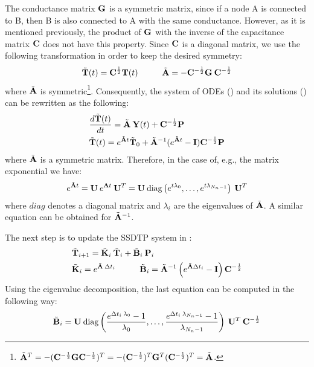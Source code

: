 The conductance matrix $\mathbf{G}$ is a symmetric matrix, since if a node A is connected to B, then B is also connected to A with the same conductance. However, as it is mentioned previously, the product of $\mathbf{G}$ with the inverse of the capacitance matrix $\mathbf{C}$ does not have this property. Since $\mathbf{C}$ is a diagonal matrix, we use the following transformation in order to keep the desired symmetry:
\begin{equation} \label{eq:substitution}
  \tilde{\v{T}}(t) = \m{C}^{\frac{1}{2}} \v{T}(t) \hs \tilde{\m{A}} = -\m{C}^{-\frac{1}{2}} \m{G} \: \m{C}^{-\frac{1}{2}}
\end{equation}
where $\tilde{\mathbf{A}}$ is symmetric\footnote{$\tilde{\mathbf{A}}^T = -(\mathbf{C}^{-\frac{1}{2}} \mathbf{G} \mathbf{C}^{-\frac{1}{2}})^T = -(\mathbf{C}^{-\frac{1}{2}})^T \mathbf{G}^T (\mathbf{C}^{-\frac{1}{2}})^T = \tilde{\mathbf{A}}$.}. Consequently, the system of ODEs () and its solutions () can be rewritten as the following:
\begin{align*}
  & \frac{d\tilde{\mathbf{T}}(t)}{dt} = \tilde{\mathbf{A}} \: \mathbf{Y}(t) + \mathbf{C}^{-\frac{1}{2}} \mathbf{P} \\
  & \tilde{\mathbf{T}}(t) = e^{\tilde{\mathbf{A}} t} \tilde{\mathbf{T}}_0 + \tilde{\mathbf{A}}^{-1} (e^{\tilde{\mathbf{A}} t} - \mathbf{I}) \mathbf{C}^{-\frac{1}{2}} \mathbf{P}
\end{align*}
where $\tilde{\mathbf{A}}$ is a symmetric matrix. Therefore, in the case of, e.g., the matrix exponential we have:
\begin{equation} \label{eq:matrix-exponential}
  e^{\tilde{\mathbf{A}} t} = \mathbf{U} \: e^{\mathbf{\Lambda} t} \: \mathbf{U}^T = \mathbf{U} \: \text{diag} \left( e^{t \lambda_0}, \dots, e^{t \lambda_{N_n - 1}} \right) \: \mathbf{U}^T
\end{equation}
where $diag$ denotes a diagonal matrix and $\lambda_i$ are the eigenvalues of $\tilde{\mathbf{A}}$. A similar equation can be obtained for $\tilde{\mathbf{A}}^{-1}$.

The next step is to update the SSDTP system in :
\begin{align}
  & \tv{T}_{i+1} = \tm{K}_i \: \tv{T}_i + \tm{B}_i \: \v{P}_i \label{eq:recurrent-equation} \\
  & \tm{K}_i = e^{\tm{A} \: \Delta t_i} \hs \tm{B}_i = \tm{A}^{-1} \left( e^{\tm{A} \Delta t_i} - \m{I} \right) \m{C}^{-\frac{1}{2}} \nonumber
\end{align}
Using the eigenvalue decomposition, the last equation can be computed in the following way:
\[
  \tilde{\mathbf{B}}_i = \mathbf{U} \: \text{diag} \left( \frac{e^{\Delta t_i \: \lambda_0} - 1}{\lambda_0}, \dots, \frac{e^{\Delta t_i \: \lambda_{N_n - 1}} - 1}{\lambda_{N_n - 1}} \right) \: \mathbf{U}^T \: \mathbf{C}^{-\frac{1}{2}}
\]

